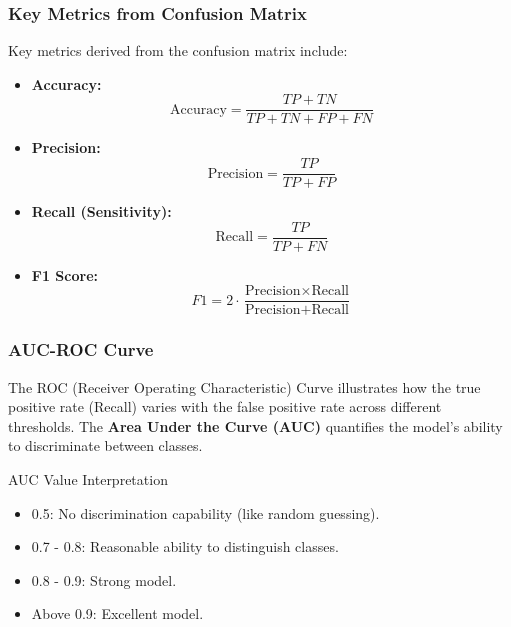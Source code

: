 \documentclass[aspectratio=169]{beamer}
\begin{document}
\begin{frame}
    \frametitle{Key Metrics from Confusion Matrix}
    Key metrics derived from the confusion matrix include:
    
    \begin{itemize}
        \item \textbf{Accuracy:} 
        \begin{equation}
        \text{Accuracy} = \frac{TP + TN}{TP + TN + FP + FN}
        \end{equation}
        \item \textbf{Precision:} 
        \begin{equation}
        \text{Precision} = \frac{TP}{TP + FP}
        \end{equation}
        \item \textbf{Recall (Sensitivity):} 
        \begin{equation}
        \text{Recall} = \frac{TP}{TP + FN}
        \end{equation}
        \item \textbf{F1 Score:} 
        \begin{equation}
        F1 = 2 \cdot \frac{\text{Precision} \times \text{Recall}}{\text{Precision} + \text{Recall}}
        \end{equation}
    \end{itemize}
\end{frame}

\begin{frame}
    \frametitle{AUC-ROC Curve}
    The ROC (Receiver Operating Characteristic) Curve illustrates how the true positive rate (Recall) varies with the false positive rate across different thresholds. The \textbf{Area Under the Curve (AUC)} quantifies the model's ability to discriminate between classes.

    \begin{block}{AUC Value Interpretation}
        \begin{itemize}
            \item 0.5: No discrimination capability (like random guessing).
            \item 0.7 - 0.8: Reasonable ability to distinguish classes.
            \item 0.8 - 0.9: Strong model.
            \item Above 0.9: Excellent model.
        \end{itemize}
    \end{block}
\end{frame}
\end{document}
